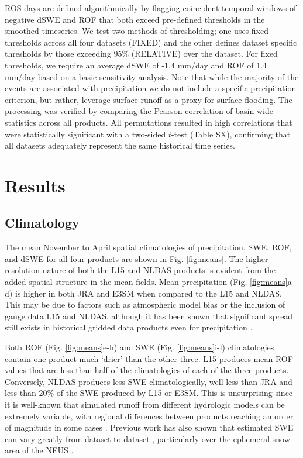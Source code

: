 \documentclass[draft]{agujournal2019}
\begin{document}
ROS days are defined algorithmically by flagging coincident temporal windows of negative dSWE and ROF that both exceed pre-defined thresholds in the smoothed timeseries. We test two methods of thresholding; one uses fixed thresholds across all four datasets (FIXED) and the other defines dataset specific thresholds by those exceeding 95\% (RELATIVE) over the dataset. For fixed thresholds, we require an average dSWE of -1.4 mm/day and ROF of 1.4 mm/day based on a basic sensitivity analysis. Note that while the majority of the events are associated with precipitation we do not include a specific precipitation criterion, but rather, leverage surface runoff as a proxy for surface flooding. The processing was verified by comparing the Pearson correlation of basin-wide statistics across all products. All permutations resulted in  high correlations that were statistically significant with a two-sided $t$-test (Table SX), confirming that all datasets adequately represent the same historical time series.

\section{Results}

\subsection{Climatology}

The mean November to April spatial climatologies of precipitation, SWE, ROF, and dSWE for all four products are shown in Fig. \ref{fig:means}. The higher resolution nature of both the L15 and NLDAS products is evident from the added spatial structure in the mean fields. Mean precipitation (Fig. \ref{fig:means}a-d) is higher in both JRA and E3SM when compared to the L15 and NLDAS. This may be due to factors such as atmospheric model bias or the inclusion of gauge data L15 and NLDAS, although it has been shown that significant spread still exists in historical gridded data products even for precipitation \citep{gutmann2012comparison,livneh2014filling,HESS}.

Both ROF (Fig. \ref{fig:means}e-h) and SWE (Fig. \ref{fig:means}i-l) climatologies contain one product much `drier' than the other three. L15 produces mean ROF values that are less than half of the climatologies of each of the three products. Conversely, NLDAS produces less SWE climatologically, well less than JRA and less than 20\% of the SWE produced by L15 or E3SM. This is unsurprising since it is well-known that simulated runoff from different hydrologic models can be extremely variable, with regional differences between products reaching an order of magnitude in some cases \citep{gudmundsson2012comparing,sood2015global,beck2017global}. Previous work has also shown that estimated SWE can vary greatly from dataset to dataset \citep{lundquist2015high}, particularly over the ephemeral snow area of the NEUS \citep{mccrary2017evaluation}.
\end{document}
